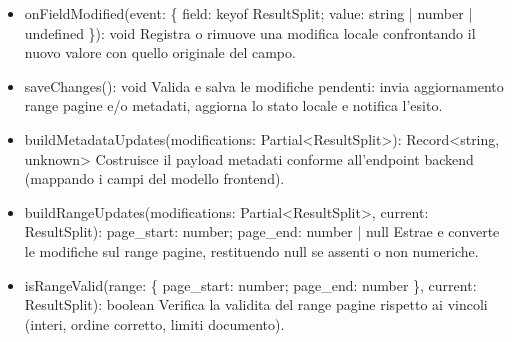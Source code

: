\documentclass[a4paper,11pt]{article}
\begin{document}
\begin{itemize}[noitemsep, topsep=0pt]
\item onFieldModified(event: \{ field: keyof ResultSplit; value: string | number | undefined \}): void
Registra o rimuove una modifica locale confrontando il nuovo valore con quello originale del campo.

\item saveChanges(): void
Valida e salva le modifiche pendenti: invia aggiornamento range pagine e/o metadati, aggiorna lo stato locale e notifica l’esito.

\item buildMetadataUpdates(modifications: Partial<ResultSplit>): Record<string, unknown>
Costruisce il payload metadati conforme all’endpoint backend (mappando i campi del modello frontend).

\item buildRangeUpdates(modifications: Partial<ResultSplit>, current: ResultSplit): { page_start: number; page_end: number } | null
Estrae e converte le modifiche sul range pagine, restituendo null se assenti o non numeriche.

\item isRangeValid(range: \{ page_start: number; page_end: number \}, current: ResultSplit): boolean
Verifica la validita del range pagine rispetto ai vincoli (interi, ordine corretto, limiti documento).
\end{itemize}
\end{document}
